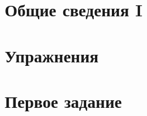 


% 


\section{Общие сведения I}


\section{Упражнения}








\section{Первое задание}







% 

